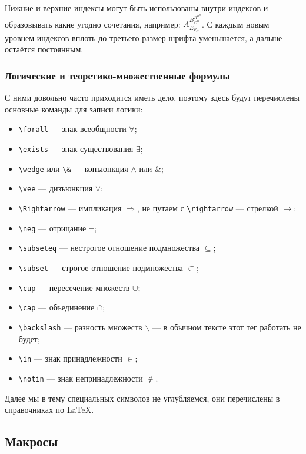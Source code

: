 \documentclass[14pt, russian]{scrartcl}
\begin{document}
Нижние и верхние индексы могут быть использованы внутри индексов и образовывать какие угодно сочетания, например: $A^{B^{B^{B^B}}_{C^D}}_{E_{F_G}}$. С каждым новым уровнем индексов вплоть до третьего размер шрифта уменьшается, а дальше остаётся постоянным.

\subsubsection{Логические и теоретико-множественные формулы}

С ними довольно часто приходится иметь дело, поэтому здесь будут перечислены основные команды для записи логики:
\begin{itemize}
\item \texttt{\textbackslash forall} --- знак всеобщности $\forall$;
\item \texttt{\textbackslash exists} --- знак существования $\exists$;
\item \texttt{\textbackslash wedge} или \texttt{\textbackslash \&} --- конъюнкция $\wedge$ или $\&$;
\item \texttt{\textbackslash vee} --- дизъюнкция $\vee$;
\item \texttt{\textbackslash Rightarrow} --- импликация $\Rightarrow$, не путаем с \texttt{\textbackslash rightarrow} --- стрелкой $\rightarrow$;
\item \texttt{\textbackslash neg} --- отрицание $\neg$;
\item \texttt{\textbackslash subseteq} --- нестрогое отношение подмножества $\subseteq$;
\item \texttt{\textbackslash subset} --- строгое отношение подмножества $\subset$;
\item \texttt{\textbackslash cup} --- пересечение множеств $\cup$;
\item \texttt{\textbackslash cap} --- объединение $\cap$;
\item \texttt{\textbackslash backslash} --- разность множеств $\backslash$ --- в обычном тексте этот тег работать не будет;
\item \texttt{\textbackslash in} --- знак принадлежности $\in$;
\item \texttt{\textbackslash notin} --- знак непринадлежности $\notin$.
\end{itemize}

Далее мы в тему специальных символов не углубляемся, они перечислены в справочниках по \LaTeX.

\subsection{Макросы}\label{Sect::Macros}
\end{document}
